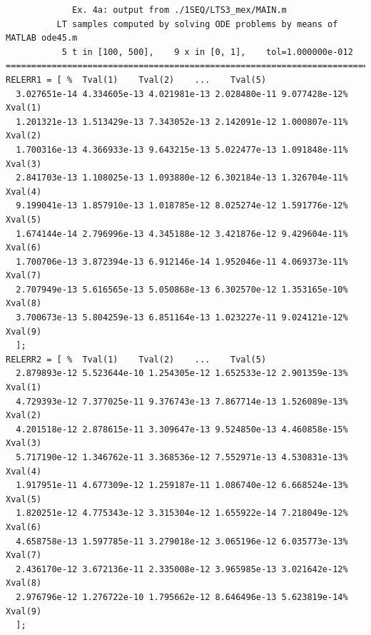 \documentclass[a4paper,10pt]{report}%
\begin{document}
\begin{lstlisting}
             Ex. 4a: output from ./1SEQ/LTS3_mex/MAIN.m
          LT samples computed by solving ODE problems by means of MATLAB ode45.m
           5 t in [100, 500],    9 x in [0, 1],    tol=1.000000e-012
====================================================================================
RELERR1 = [ %  Tval(1)    Tval(2)    ...    Tval(5)
  3.027651e-14 4.334605e-13 4.021981e-13 2.028480e-11 9.077428e-12% Xval(1)
  1.201321e-13 1.513429e-13 7.343052e-13 2.142091e-12 1.000807e-11% Xval(2)
  1.700316e-13 4.366933e-13 9.643215e-13 5.022477e-13 1.091848e-11% Xval(3)
  2.841703e-13 1.108025e-13 1.093880e-12 6.302184e-13 1.326704e-11% Xval(4)
  9.199041e-13 1.857910e-13 1.018785e-12 8.025274e-12 1.591776e-12% Xval(5)
  1.674144e-14 2.796996e-13 4.345188e-12 3.421876e-12 9.429604e-11% Xval(6)
  1.700706e-13 3.872394e-13 6.912146e-14 1.952046e-11 4.069373e-11% Xval(7)
  2.707949e-13 5.616565e-13 5.050868e-13 6.302570e-12 1.353165e-10% Xval(8)
  3.700673e-13 5.804259e-13 6.851164e-13 1.023227e-11 9.024121e-12% Xval(9)
  ];
RELERR2 = [ %  Tval(1)    Tval(2)    ...    Tval(5)
  2.879893e-12 5.523644e-10 1.254305e-12 1.652533e-12 2.901359e-13% Xval(1)
  4.729393e-12 7.377025e-11 9.376743e-13 7.867714e-13 1.526089e-13% Xval(2)
  4.201518e-12 2.878615e-11 3.309647e-13 9.524850e-13 4.460858e-15% Xval(3)
  5.717190e-12 1.346762e-11 3.368536e-12 7.552971e-13 4.530831e-13% Xval(4)
  1.917951e-11 4.677309e-12 1.259187e-11 1.086740e-12 6.668524e-13% Xval(5)
  1.820251e-12 4.775343e-12 3.315304e-12 1.655922e-14 7.218049e-12% Xval(6)
  4.658758e-13 1.597785e-11 3.279018e-12 3.065196e-12 6.035773e-13% Xval(7)
  2.436170e-12 3.672136e-11 2.335008e-12 3.965985e-13 3.021642e-12% Xval(8)
  2.976796e-12 1.276722e-10 1.795662e-12 8.646496e-13 5.623819e-14% Xval(9)
  ];
\end{lstlisting}
\end{document}
